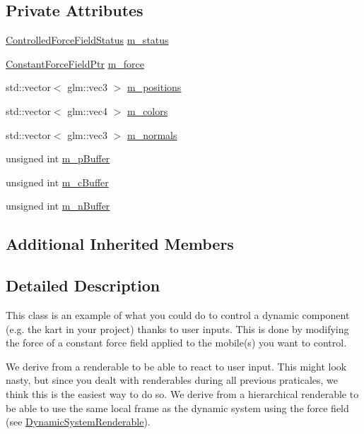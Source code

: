 \subsection*{Private Attributes}
\begin{DoxyCompactItemize}
\item 
\hyperlink{classControlledForceFieldStatus}{Controlled\+Force\+Field\+Status} \hyperlink{classControlledForceFieldRenderable_aeb5e06ce7914d6050578f9466d3c67ad}{m\+\_\+status}
\item 
\hyperlink{ConstantForceField_8hpp_a7b80b566be4aeb0b5474a8aeb2e0ff49}{Constant\+Force\+Field\+Ptr} \hyperlink{classControlledForceFieldRenderable_a6832a057549138e1f7aea221677be189}{m\+\_\+force}
\item 
std\+::vector$<$ glm\+::vec3 $>$ \hyperlink{classControlledForceFieldRenderable_a754e3c8fe79f1d95020f631fae8a6e40}{m\+\_\+positions}
\item 
std\+::vector$<$ glm\+::vec4 $>$ \hyperlink{classControlledForceFieldRenderable_a825c0d5323c7bc212b4b9325614a9414}{m\+\_\+colors}
\item 
std\+::vector$<$ glm\+::vec3 $>$ \hyperlink{classControlledForceFieldRenderable_ab6d76f2f8b7ea00b0facdc0938808a25}{m\+\_\+normals}
\item 
unsigned int \hyperlink{classControlledForceFieldRenderable_a53bfe9b2180551039b1c7eb54f2d4974}{m\+\_\+p\+Buffer}
\item 
unsigned int \hyperlink{classControlledForceFieldRenderable_a7494339c295c2b0b6550e34c89fbd9c1}{m\+\_\+c\+Buffer}
\item 
unsigned int \hyperlink{classControlledForceFieldRenderable_a314a07bcaed1f7db3ded7283996474c3}{m\+\_\+n\+Buffer}
\end{DoxyCompactItemize}
\subsection*{Additional Inherited Members}


\subsection{Detailed Description}
This class is an example of what you could do to control a dynamic component (e.\+g. the kart in your project) thanks to user inputs. This is done by modifying the force of a constant force field applied to the mobile(s) you want to control.

We derive from a renderable to be able to react to user input. This might look nasty, but since you dealt with renderables during all previous praticales, we think this is the easiest way to do so. We derive from a hierarchical renderable to be able to use the same local frame as the dynamic system using the force field (see \hyperlink{classDynamicSystemRenderable}{Dynamic\+System\+Renderable}). 

